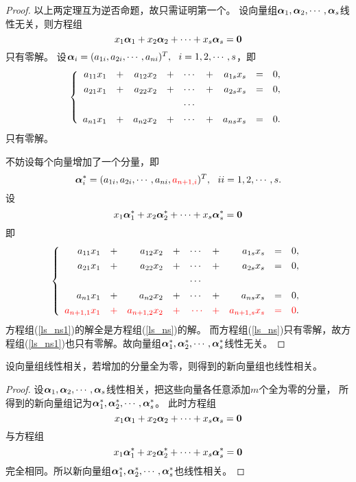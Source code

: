 \begin{frame}[allowframebreaks]
\begin{proof}
以上两定理互为逆否命题，故只需证明第一个。 
设向量组$\boldsymbol{\alpha}_1,\boldsymbol{\alpha}_2,\cdots,\boldsymbol{\alpha}_s$线性无关，则方程组
$$
x_1\boldsymbol{\alpha}_1+x_2\boldsymbol{\alpha}_2+\cdots+x_s\boldsymbol{\alpha}_s=\boldsymbol{0}
$$
只有零解。 设$\boldsymbol{\alpha}_i=(a_{1i},a_{2i},\cdots,a_{ni})^T,~~ i=1,2,\cdots,s$，即
\begin{equation}\label{ls_ns}
  \left\{
  \begin{array}{rcrcrcrcr}
    a_{11}x_1&+&a_{12}x_2&+&\cdots&+&a_{1s}x_s&=&0,\\[0.05in]
    a_{21}x_1&+&a_{22}x_2&+&\cdots&+&a_{2s}x_s&=&0,\\[0.05in]
    &&&&\cdots&&&&\\[0.05in]
    a_{n1}x_1&+&a_{n2}x_2&+&\cdots&+&a_{ns}x_s&=&0.
  \end{array}
  \right.
\end{equation}
只有零解。


不妨设每个向量增加了一个分量，即
$$
\boldsymbol{\alpha}_i^*= (a_{1i},a_{2i},\cdots,a_{ni},\textcolor{red}{a_{n+1,i}})^T, ~~ ii=1,2,\cdots,s.
$$ 
设
$$
x_1\boldsymbol{\alpha}_1^*+x_2\boldsymbol{\alpha}_2^*+\cdots+x_s\boldsymbol{\alpha}_s^*=\boldsymbol{0}
$$
即
\begin{equation}\label{ls_ns1}
  \left\{
  \begin{array}{rcrcrcrcr}
    a_{11}x_1&+&a_{12}x_2&+&\cdots&+&a_{1s}x_s&=&0,\\[0.05in]
    a_{21}x_1&+&a_{22}x_2&+&\cdots&+&a_{2s}x_s&=&0,\\[0.05in]
    &&&&\cdots&&&&\\[0.05in]
    a_{n1}x_1&+&a_{n2}x_2&+&\cdots&+&a_{ns}x_s&=&0,\\[0.05in]
    \textcolor{red}{a_{n+1,1}x_1}&\textcolor{red}{+}&\textcolor{red}{a_{n+1,2}x_2}&\textcolor{red}{+}&\textcolor{red}{\cdots}&\textcolor{red}{+}&\textcolor{red}{a_{n+1,s}x_s}&\textcolor{red}{=}&\textcolor{red}{0}.
  \end{array}
  \right.
\end{equation}
方程组(\ref{ls_ns1})的解全是方程组(\ref{ls_ns})的解。 而方程组(\ref{ls_ns})只有零解，故方程组(\ref{ls_ns1})也只有零解。故向量组$\boldsymbol{\alpha}^*_1,\boldsymbol{\alpha}^*_2,\cdots,\boldsymbol{\alpha}^*_s$线性无关。
\end{proof}
\end{frame}

\begin{frame}
\begin{tuilun}
  设向量组线性相关，若增加的分量全为零，则得到的新向量组也线性相关。
\end{tuilun}
\pause 
\begin{proof}
设$\boldsymbol{\alpha}_1,\boldsymbol{\alpha}_2,\cdots,\boldsymbol{\alpha}_s$线性相关，把这些向量各任意添加$m$个全为零的分量，
所得到的新向量组记为$\boldsymbol{\alpha}^*_1,\boldsymbol{\alpha}^*_2,\cdots,\boldsymbol{\alpha}^*_s$。 
此时方程组
$$
x_1\boldsymbol{\alpha}_1+x_2\boldsymbol{\alpha}_2+\cdots+x_s\boldsymbol{\alpha}_s=\boldsymbol{0}
$$ 
与方程组
$$
x_1\boldsymbol{\alpha}_1^*+x_2\boldsymbol{\alpha}_2^*+\cdots+x_s\boldsymbol{\alpha}_s^*=\boldsymbol{0}
$$
完全相同。所以新向量组$\boldsymbol{\alpha}^*_1,\boldsymbol{\alpha}^*_2,\cdots,\boldsymbol{\alpha}^*_s$也线性相关。
\end{proof}
\end{frame}


